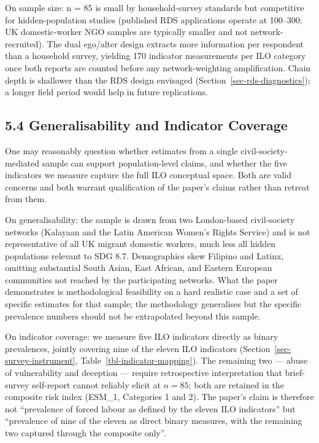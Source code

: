\documentclass[
  12pt,
  letterpaper,
  DIV=11,
  numbers=noendperiod]{scrartcl}
\begin{document}
On sample size: n = 85 is small by household-survey standards but
competitive for hidden-population studies (published RDS applications
operate at 100--300; UK domestic-worker NGO samples are typically
smaller and not network-recruited). The dual ego/alter design extracts
more information per respondent than a household survey, yielding 170
indicator measurements per ILO category once both reports are counted
before any network-weighting amplification. Chain depth is shallower
than the RDS design envisaged (Section~\ref{sec-rds-diagnostics}); a
longer field period would help in future replications.

\subsection{5.4 Generalisability and Indicator
Coverage}\label{sec-generalisability}

One may reasonably question whether estimates from a single
civil-society-mediated sample can support population-level claims, and
whether the five indicators we measure capture the full ILO conceptual
space. Both are valid concerns and both warrant qualification of the
paper's claims rather than retreat from them.

On generalisability: the sample is drawn from two London-based
civil-society networks (Kalayaan and the Latin American Women's Rights
Service) and is not representative of all UK migrant domestic workers,
much less all hidden populations relevant to SDG 8.7. Demographics skew
Filipino and Latinx, omitting substantial South Asian, East African, and
Eastern European communities not reached by the participating networks.
What the paper demonstrates is methodological feasibility on a hard
realistic case and a set of specific estimates for that sample; the
methodology generalises but the specific prevalence numbers should not
be extrapolated beyond this sample.

On indicator coverage: we measure five ILO indicators directly as binary
prevalences, jointly covering nine of the eleven ILO indicators
(Section~\ref{sec-survey-instrument},
Table~\ref{tbl-indicator-mapping}). The remaining two --- abuse of
vulnerability and deception --- require retrospective interpretation
that brief-survey self-report cannot reliably elicit at \(n = 85\); both
are retained in the composite risk index (ESM\_1, Categories 1 and 2).
The paper's claim is therefore not ``prevalence of forced labour as
defined by the eleven ILO indicators'' but ``prevalence of nine of the
eleven as direct binary measures, with the remaining two captured
through the composite only''.
\end{document}
